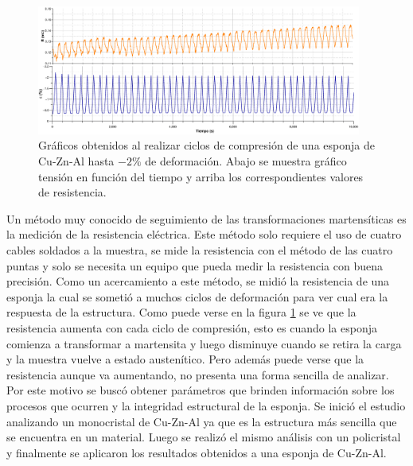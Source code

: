 \documentclass[a4paper,12pt,fleqn,twoside,openany]{book}
\begin{document}
 \begin{figure}[h]
 \centering
 \includegraphics[width=0.95\textwidth]{Img/Resultados/Resistencia/Ciclos.eps}
 \caption{Gráficos obtenidos al realizar ciclos de compresión de una esponja de Cu-Zn-Al hasta $-2\%$ de deformación. Abajo se muestra gráfico tensión en función del tiempo y arriba los correspondientes valores de resistencia. } 
 \label{fig:CiclosResistencia}
 \end{figure}


 
 
 
 
 Un método muy conocido de seguimiento de las transformaciones martensíticas es la medición de la resistencia eléctrica. Este método solo requiere el uso de cuatro cables soldados a la muestra, se mide la resistencia con el método de las cuatro puntas y solo se necesita un equipo que pueda medir la resistencia con buena precisión. Como un acercamiento a este método, se midió la resistencia de una esponja la cual se sometió a muchos ciclos de deformación para ver cual era la respuesta de la estructura. Como puede verse en la figura \ref{fig:CiclosResistencia} se ve que la resistencia aumenta con cada ciclo de compresión, esto es cuando la esponja comienza a transformar a martensita y luego disminuye cuando se retira la carga y la muestra vuelve a estado austenítico. Pero además puede verse que la resistencia aunque va aumentando, no presenta una forma sencilla de analizar. Por este motivo se buscó obtener parámetros que brinden información sobre los procesos que ocurren y la integridad estructural de la esponja. Se inició el estudio analizando un monocristal de Cu-Zn-Al ya que es la estructura más sencilla que se encuentra en un material. Luego se realizó el mismo análisis con un policristal y finalmente se aplicaron los resultados obtenidos a una esponja de Cu-Zn-Al.

\end{document}
